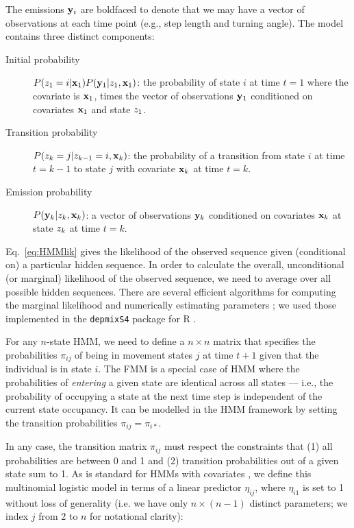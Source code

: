 \documentclass{bmcart}
\begin{document}
The emissions $\mathbf{y}_i$ are boldfaced to denote that we may have a vector of observations at each time point (e.g., step length and turning angle).
The model contains three distinct components:

\begin{description}
\item[Initial probability] $P(z_{1} = i | \mathbf{x}_{1}) P(\mathbf{y}_{1} | z_{1}, \mathbf{x}_{1} )$: the probability of state $i$ at time $t=1$ where the covariate is $\mathbf{x}_{1}$, times the vector of observations $\mathbf{y}_{1}$ conditioned on covariates $\mathbf{x}_{1}$ and state $z_{1}$.


\item[Transition probability] $P(z_{k}=j | z_{k-1}=i,\mathbf{x}_{k})$: the probability of a transition from state $i$ at time $t=k-1$ to state $j$ with covariate $\mathbf{x}_{k}$ at time $t=k$.


\item[Emission probability] $P(\mathbf{y}_{k} | z_{k},\mathbf{x}_{k})$: a vector of observations $\mathbf{y}_{k}$ conditioned on covariates $\mathbf{x}_{k}$ at state $z_{k}$ at time $t=k$.  
\end{description}

Eq.~\ref{eq:HMMlik} gives the likelihood of the observed sequence 
given (conditional on) a particular
hidden sequence. 
In order to calculate the overall, unconditional (or marginal) 
likelihood of the 
observed sequence, we need to average over all possible hidden sequences. 
There are several efficient algorithms for computing the marginal likelihood and
numerically estimating parameters \cite{zucchini_hidden_2009};
we used those implemented in the \texttt{depmixS4} package for R
\cite{visser2010depmixs4,R}.

For any $n$-state HMM, we need to define a $n \times n$ matrix that specifies the probabilities $\pi_{ij}$ of being in movement states $j$ at time $t+1$ given that the individual is in state $i$.  The FMM is a special case of HMM where the probabilities of \emph{entering} a given state are identical across all states --- i.e., the probability of occupying a state at the next time step is independent of the current state occupancy. It can be modelled in the HMM framework by setting the transition probabilities  $\pi_{ij} = \pi_{i*}$.

In any case, the transition matrix $\pi_{ij}$ must respect the constraints that (1) all probabilities are between 0 and 1 and (2) transition probabilities out of a given state sum to 1.
As is standard for HMMs with covariates \cite{visser2010depmixs4}, we define this multinomial logistic model in terms of a linear predictor $\eta_{ij}$, where $\eta_{i1}$ is set to 1 without loss of generality (i.e. we have only $n \times (n-1)$ distinct parameters; we index $j$ from 2 to $n$ for notational clarity):
\end{document}
